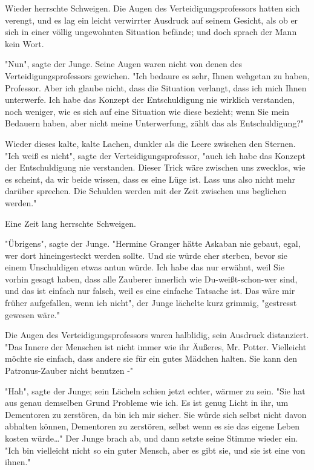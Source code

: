 {Wieder herrschte Schweigen. Die Augen des Verteidigungsprofessors hatten sich verengt, und es lag ein leicht verwirrter Ausdruck auf seinem Gesicht, als ob er sich in einer völlig ungewohnten Situation befände; und doch sprach der Mann kein Wort.

"Nun", sagte der Junge. Seine Augen waren nicht von denen des Verteidigungsprofessors gewichen. "Ich bedaure es sehr, Ihnen wehgetan zu haben, Professor. Aber ich glaube nicht, dass die Situation verlangt, dass ich mich Ihnen unterwerfe. Ich habe das Konzept der Entschuldigung nie wirklich verstanden, noch weniger, wie es sich auf eine Situation wie diese bezieht; wenn Sie mein Bedauern haben, aber nicht meine Unterwerfung, zählt das als Entschuldigung?"

Wieder dieses kalte, kalte Lachen, dunkler als die Leere zwischen den Sternen. "Ich weiß es nicht", sagte der Verteidigungsprofessor, "auch ich habe das Konzept der Entschuldigung nie verstanden. Dieser Trick wäre zwischen uns zwecklos, wie es scheint, da wir beide wissen, dass es eine Lüge ist. Lass uns also nicht mehr darüber sprechen. Die Schulden werden mit der Zeit zwischen uns beglichen werden."

Eine Zeit lang herrschte Schweigen.

"Übrigens", sagte der Junge. "Hermine Granger hätte Askaban nie gebaut, egal, wer dort hineingesteckt werden sollte. Und sie würde eher sterben, bevor sie einem Unschuldigen etwas antun würde. Ich habe das nur erwähnt, weil Sie vorhin gesagt haben, dass alle Zauberer innerlich wie Du-weißt-schon-wer sind, und das ist einfach nur falsch, weil es eine einfache Tatsache ist. Das wäre mir früher aufgefallen, wenn ich nicht", der Junge lächelte kurz grimmig, "gestresst gewesen wäre."

Die Augen des Verteidigungsprofessors waren halblidig, sein Ausdruck distanziert. "Das Innere der Menschen ist nicht immer wie ihr Äußeres, Mr. Potter. Vielleicht möchte sie einfach, dass andere sie für ein gutes Mädchen halten. Sie kann den Patronus-Zauber nicht benutzen -"

"Hah", sagte der Junge; sein Lächeln schien jetzt echter, wärmer zu sein. "Sie hat aus genau demselben Grund Probleme wie ich. Es ist genug Licht in ihr, um Dementoren zu zerstören, da bin ich mir sicher. Sie würde sich selbst nicht davon abhalten können, Dementoren zu zerstören, selbst wenn es sie das eigene Leben kosten würde…" Der Junge brach ab, und dann setzte seine Stimme wieder ein. "Ich bin vielleicht nicht so ein guter Mensch, aber es gibt sie, und sie ist eine von ihnen."

}
